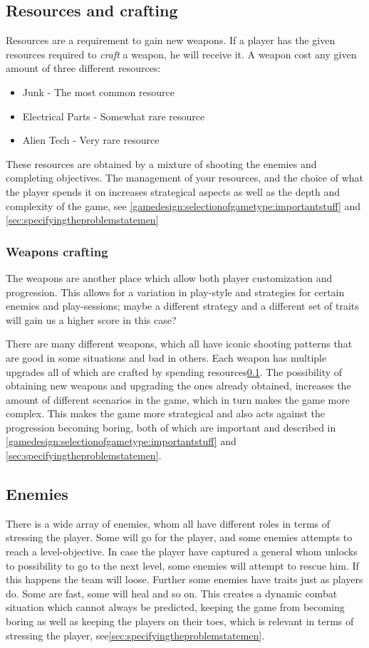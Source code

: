 \subsection{Resources and crafting}\label{gamedesign:ourgame:crafting}
Resources are a requirement to gain new weapons.
If a player has the given resources required to \emph{craft} a weapon, he will receive it.
A weapon cost any given amount of three different resources:
\begin{itemize}
\item Junk - The most common resource
\item Electrical Parts - Somewhat rare resource
\item Alien Tech - Very rare resource
\end{itemize}

These resources are obtained by a mixture of shooting the enemies and completing objectives. 
The management of your resources, and the choice of what the player spends it on increases strategical aspects as well as the depth and complexity of the game, see \ref{gamedesign:selectionofgametype:importantstuff} and \ref{sec:specifyingtheproblemstatemen}

\subsubsection*{Weapons crafting}\label{gamedesign:ourgame:weapons}
The weapons are another place which allow both player customization and progression. This allows for a variation in play-style and strategies for certain enemies and play-sessions; maybe a different strategy and a different set of traits will gain us a higher score in this case?

There are many different weapons, which all have iconic shooting patterns that are good in some situations and bad in others.
Each weapon has multiple upgrades all of which are crafted by spending resources\ref{gamedesign:ourgame:crafting}. The possibility of obtaining new weapons and upgrading the ones already obtained, increases the amount of different scenarios in the game, which in turn makes the game more complex. This makes the game more strategical and also acts against the progression becoming boring, both of which are important and described in \ref{gamedesign:selectionofgametype:importantstuff} and \ref{sec:specifyingtheproblemstatemen}.

\subsection{Enemies}
There is a wide array of enemies, whom all have different roles in terms of stressing the player. Some will go for the player, and some enemies attempts to reach a level-objective. In case the player have captured a general whom unlocks to possibility to go to the next level, some enemies will attempt to rescue him. If this happens the team will loose. 
Further some enemies have traits just as players do. Some are fast, some will heal and so on. This creates a dynamic combat situation which cannot always be predicted, keeping the game from becoming boring as well as keeping the players on their toes, which is relevant in terms of stressing the player, see\ref{sec:specifyingtheproblemstatemen}.

